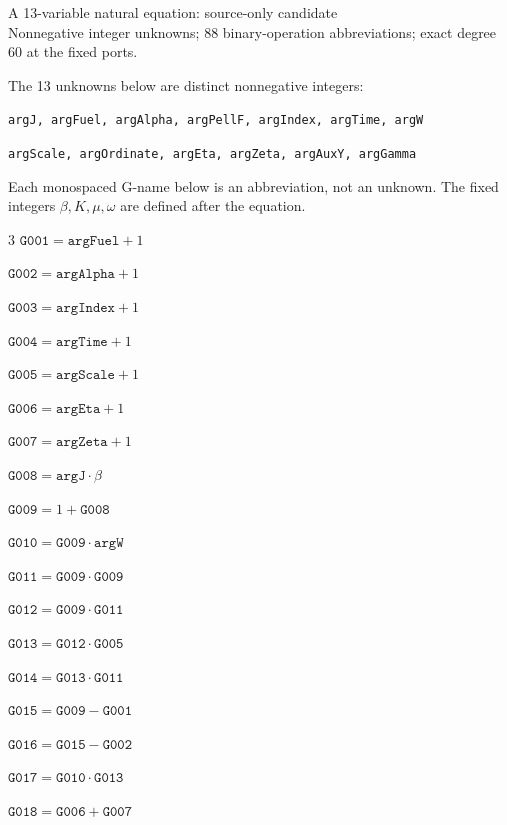 \documentclass[10pt]{article}
\begin{document}
\begin{center}{\Large A 13-variable natural equation: source-only candidate}\\
Nonnegative integer unknowns; 88 binary-operation abbreviations; exact degree 60 at the fixed ports.
\end{center}
The 13 unknowns below are distinct nonnegative integers:
\par\small
\noindent\texttt{argJ, argFuel, argAlpha, argPellF, argIndex, argTime, argW}\par
\noindent\texttt{argScale, argOrdinate, argEta, argZeta, argAuxY, argGamma}\par
\normalsize
Each monospaced G-name below is an abbreviation, not an unknown. The fixed integers $\beta,K,\mu,\omega$ are defined after the equation.
\begin{multicols}{3}\small
\noindent $\mathtt{G001}=\mathtt{argFuel}+1$\par
\noindent $\mathtt{G002}=\mathtt{argAlpha}+1$\par
\noindent $\mathtt{G003}=\mathtt{argIndex}+1$\par
\noindent $\mathtt{G004}=\mathtt{argTime}+1$\par
\noindent $\mathtt{G005}=\mathtt{argScale}+1$\par
\noindent $\mathtt{G006}=\mathtt{argEta}+1$\par
\noindent $\mathtt{G007}=\mathtt{argZeta}+1$\par
\noindent $\mathtt{G008}=\mathtt{argJ}\cdot \beta$\par
\noindent $\mathtt{G009}=1+\mathtt{G008}$\par
\noindent $\mathtt{G010}=\mathtt{G009}\cdot \mathtt{argW}$\par
\noindent $\mathtt{G011}=\mathtt{G009}\cdot \mathtt{G009}$\par
\noindent $\mathtt{G012}=\mathtt{G009}\cdot \mathtt{G011}$\par
\noindent $\mathtt{G013}=\mathtt{G012}\cdot \mathtt{G005}$\par
\noindent $\mathtt{G014}=\mathtt{G013}\cdot \mathtt{G011}$\par
\noindent $\mathtt{G015}=\mathtt{G009}-\mathtt{G001}$\par
\noindent $\mathtt{G016}=\mathtt{G015}-\mathtt{G002}$\par
\noindent $\mathtt{G017}=\mathtt{G010}\cdot \mathtt{G013}$\par
\noindent $\mathtt{G018}=\mathtt{G006}+\mathtt{G007}$\par

\end{multicols}
\end{document}
